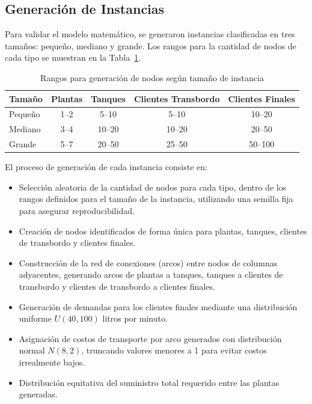 \documentclass[12pt]{article}
\begin{document}
\subsection{Generación de Instancias}

Para validar el modelo matemático, se generaron instancias clasificadas en tres tamaños: pequeño, mediano y grande. Los rangos para la cantidad de nodos de cada tipo se muestran en la Tabla~\ref{tab:rangos_nodos}.

\begin{table}[h]
\centering
\caption{Rangos para generación de nodos según tamaño de instancia}
\label{tab:rangos_nodos}
\begin{tabular}{|l|c|c|c|c|}
\hline
\textbf{Tamaño} & \textbf{Plantas} & \textbf{Tanques} & \textbf{Clientes Transbordo} & \textbf{Clientes Finales} \\
\hline
Pequeño & 1--2 & 5--10 & 5--10 & 10--20 \\
\hline
Mediano & 3--4 & 10--20 & 10--20 & 20--50 \\
\hline
Grande & 5--7 & 20--50 & 25--50 & 50--100 \\
\hline
\end{tabular}
\end{table}

El proceso de generación de cada instancia consiste en:

\begin{itemize}
    \item Selección aleatoria de la cantidad de nodos para cada tipo, dentro de los rangos definidos para el tamaño de la instancia, utilizando una semilla fija para asegurar reproducibilidad.
    \item Creación de nodos identificados de forma única para plantas, tanques, clientes de transbordo y clientes finales.
    \item Construcción de la red de conexiones (arcos) entre nodos de columnas adyacentes, generando arcos de plantas a tanques, tanques a clientes de transbordo y clientes de transbordo a clientes finales.
    \item Generación de demandas para los clientes finales mediante una distribución uniforme \(U(40,100)\) litros por minuto.
    \item Asignación de costos de transporte por arco generados con distribución normal \(N(8, 2)\), truncando valores menores a 1 para evitar costos irrealmente bajos.
    \item Distribución equitativa del suministro total requerido entre las plantas generadas.
\end{itemize}
\end{document}
